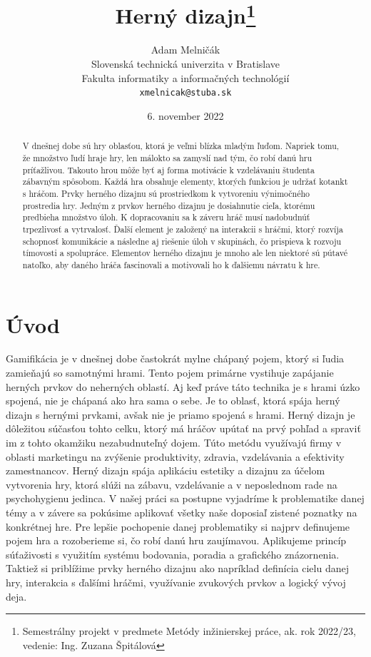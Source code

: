 \documentclass[10pt,twoside,slovak,a4paper]{article}
\title{Herný dizajn\thanks{Semestrálny projekt v predmete Metódy inžinierskej práce, ak. rok 2022/23, vedenie: Ing. Zuzana Špitálová}}
\author{Adam Melničák\\[2pt]
	{\small Slovenská technická univerzita v Bratislave}\\
	{\small Fakulta informatiky a informačných technológií}\\
	{\small \texttt{xmelnicak@stuba.sk}}
	}
\date{\small 6. november 2022}
\begin{document}
\maketitle

\begin{abstract}
V dnešnej dobe sú hry oblasťou, ktorá je veľmi blízka mladým ľuďom. Napriek tomu, že množstvo ľudí hraje hry, len málokto sa zamyslí nad tým, čo robí danú hru príťažlivou. Takouto hrou môže byť aj forma motivácie k vzdelávaniu študenta zábavným spôsobom. Každá hra obsahuje elementy, ktorých funkciou je udržať kotankt s hráčom. Prvky herného dizajnu sú prostriedkom k  vytvoreniu výnimočného prostredia hry.  Jedným z prvkov herného dizajnu je dosiahnutie cieľa, ktorému predbieha množstvo úloh. K dopracovaniu sa k záveru hráč musí nadobudnúť trpezlivosť a vytrvalosť.  Ďalší element je založený na interakcii s hráčmi, ktorý rozvíja schopnosť komunikácie a následne aj riešenie úloh v skupinách, čo prispieva k rozvoju tímovosti a spolupráce.  Elementov herného dizajnu je mnoho ale len niektoré sú pútavé natoľko, aby daného hráča fascinovali a motivovali ho k ďalšiemu návratu k hre.
\end{abstract}



\section{Úvod}
Gamifikácia je v dnešnej dobe častokrát mylne chápaný pojem,  ktorý si ľudia zamieňajú so samotnými hrami.  Tento pojem primárne vystihuje zapájanie herných prvkov do neherných oblastí. Aj keď práve táto technika je s hrami úzko spojená, nie je chápaná ako hra sama o sebe.  Je to oblasť,  ktorá spája herný dizajn s hernými prvkami,  avšak nie je priamo spojená s hrami.  Herný dizajn je dôležitou súčasťou tohto celku,  ktorý má hráčov upútať na prvý pohľad a spraviť im z tohto okamžiku nezabudnuteľný dojem.  Túto metódu využívajú firmy v oblasti marketingu na zvýšenie produktivity, zdravia, vzdelávania a efektivity zamestnancov. Herný dizajn spája aplikáciu estetiky a dizajnu za účelom vytvorenia hry, ktorá slúži na zábavu, vzdelávanie a v neposlednom rade na psychohygienu jedinca.  V našej práci sa postupne vyjadríme k problematike danej témy a v závere sa pokúsime aplikovať všetky naše doposiaľ zistené poznatky na konkrétnej hre.  Pre lepšie pochopenie danej problematiky si najprv definujeme pojem hra a rozoberieme si,  čo robí danú hru zaujímavou. Aplikujeme princíp súťaživosti s využitím systému bodovania,  poradia a grafického znázornenia.  Taktiež si priblížime prvky herného dizajnu ako napríklad definícia cielu danej hry,  interakcia s ďalšími hráčmi,  využívanie zvukových prvkov a logický vývoj deja.  
\end{document}
